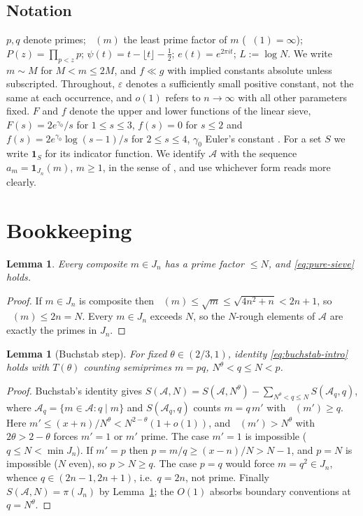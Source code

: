 \documentclass[11pt]{article}
\newtheorem{lemma}[theorem]{Lemma}
\theoremstyle{remark}
\DeclareMathOperator{\pmin}{P^{-}}
\newcommand{\N}{N}
\newcommand{\J}{J_n}
\newcommand{\A}{\mathcal{A}}
\begin{document}
\subsection*{Notation}
$p,q$ denote primes; $\pmin(m)$ the least prime factor of $m$ ($\pmin(1)=\infty$);
$P(z)=\prod_{p<z}p$; $\psi(t)=t-\lfloor t\rfloor-\tfrac12$;
$e(t)=e^{2\pi i t}$; $L:=\log \N$. We write $m\sim M$ for $M<m\le 2M$, and
$f\ll g$ with implied constants absolute unless subscripted. Throughout,
$\varepsilon$ denotes a sufficiently small positive constant, not the same at each
occurrence, and $o(1)$ refers to $n\to\infty$ with all other parameters fixed.
$F$ and $f$ denote the upper and lower functions of the linear sieve,
$F(s)=2e^{\gamma_0}/s$ for $1\le s\le 3$, $f(s)=0$ for $s\le 2$ and
$f(s)=2e^{\gamma_0}\log(s-1)/s$ for $2\le s\le 4$, $\gamma_0$ Euler's constant
\cite{FriedlanderIwaniec}. For a set $S$ we write $\mathbf{1}_S$ for its indicator function. We identify $\A$ with the sequence $a_m=\mathbf{1}_{\J}(m)$, $m\ge 1$, in the sense of \cite{FriedlanderIwaniec}, and use whichever form reads more clearly.

\section{Bookkeeping}\label{sec:bookkeeping}

\begin{lemma}\label{lem:structural}
Every composite $m\in\J$ has a prime factor $\le \N$, and \eqref{eq:pure-sieve} holds.
\end{lemma}

\begin{proof}
If $m\in\J$ is composite then $\pmin(m)\le\sqrt m\le\sqrt{4n^2+n}<2n+1$, so
$\pmin(m)\le 2n=\N$. Every $m\in\J$ exceeds $\N$, so the $\N$-rough elements of $\A$
are exactly the primes in $\J$.
\end{proof}

\begin{lemma}[Buchstab step]\label{lem:buchstab}
For fixed $\theta\in(2/3,1)$, identity \eqref{eq:buchstab-intro} holds with
$T(\theta)$ counting semiprimes $m=pq$, $\N^{\theta}<q\le\N<p$.
\end{lemma}

\begin{proof}
Buchstab's identity gives
$S(\A,\N)=S(\A,\N^{\theta})-\sum_{\N^{\theta}<q\le \N}S(\A_q,q)$,
where $\A_q=\{m\in\A: q\mid m\}$ and $S(\A_q,q)$ counts $m=q\,m'$ with
$\pmin(m')\ge q$. Here $m'\le (x+n)/\N^{\theta}<\N^{2-\theta}(1+o(1))$, and
$\pmin(m')>\N^{\theta}$ with $2\theta>2-\theta$ forces $m'=1$ or $m'$ prime.
The case $m'=1$ is impossible ($q\le\N<\min\J$). If $m'=p$ then
$p=m/q\ge (x-n)/\N>\N-1$, and $p=\N$ is impossible ($\N$ even), so $p>\N\ge q$.
The case $p=q$ would force $m=q^2\in\J$, whence $q\in(2n-1,2n+1)$, i.e.\ $q=2n$,
not prime. Finally $S(\A,\N)=\pi(\J)$ by Lemma~\ref{lem:structural}; the $O(1)$
absorbs boundary conventions at $q=\N^{\theta}$.
\end{proof}
\end{document}
